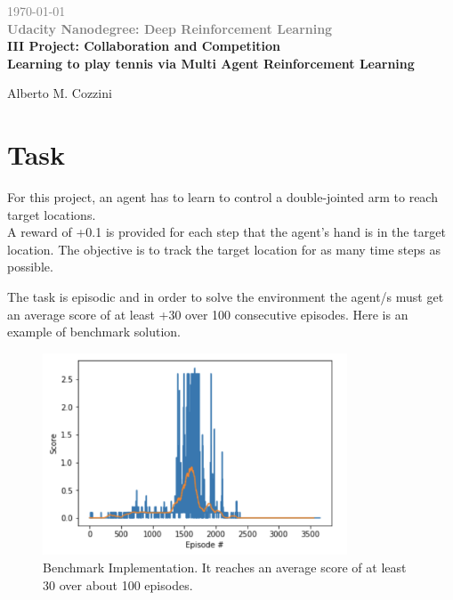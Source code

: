 \documentclass[pagenumber=off]{article}
\begin{document}
\begin{titlepage}
\begin{center}
\vspace{1cm}
{\textcolor{gray}\today}\\
{\textcolor{gray}{\bf Udacity Nanodegree: Deep Reinforcement Learning }}\\
\vspace{1.5cm}
{\textcolor{coolblack}{\huge \bf III Project: Collaboration and Competition}}\\
\vspace{0.5cm}
{\textcolor{coolblack}{\Large \bf  Learning to play tennis via Multi Agent Reinforcement Learning}}
\par
\vspace{0.5cm}
\vspace{6cm}
\end{center}
\tableofcontents

\vspace{4cm}

\begin{center}
{Alberto M. Cozzini}\\
\end{center}
\end{titlepage}

\section{Task}
For this project, an agent has to learn to control a double-jointed arm to reach target locations.\\
A reward of +0.1 is provided for each step that the agent's hand is in the target location. The objective is to track the target location for as many time steps as possible.

The task is episodic and in order to solve the environment the agent/s must get an average score of at least +30 over 100 consecutive episodes. Here is an example of benchmark solution.
\begin{figure}[!h]
  \centerline{\includegraphics[page=1, height=6cm, width=12 cm, angle=0]{./Plots/Benchmark_Score.png}}
  \caption{Benchmark Implementation. It reaches an average score of at least 30 over about 100 episodes.}
\end{figure}
\end{document}
